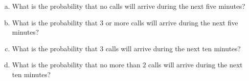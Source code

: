 \documentclass[12pt, letterpaper]{article}
\theoremstyle{definition}
\begin{document}
\begin{enumerate}[(a)]

\item What is the probability that no calls will arrive during the next five minutes?

\vfill

\item What is the probability that $3$ or more calls will arrive during the next five minutes?

\vfill

\item What is the probability that $3$ calls will arrive during the next ten minutes?

\vfill

\item What is the probability that no more than $2$ calls will arrive during the next ten minutes?

\vfill

\end{enumerate}
\end{document}
